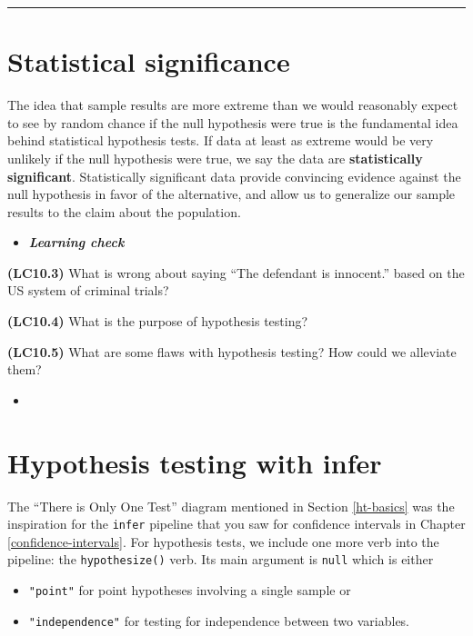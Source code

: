 \documentclass[12pt,]{krantz}
\providecommand{\tightlist}{%
  \setlength{\itemsep}{0pt}\setlength{\parskip}{0pt}}
\newenvironment{rmdblock}[1]
  {\begin{shaded*}
  \begin{itemize}
  \renewcommand{\labelitemi}{
    \raisebox{-.7\height}[0pt][0pt]{
    }
  }
  \item
  }
  {
  \end{itemize}
  \end{shaded*}
  }
\newenvironment{learncheck}
  {\begin{rmdblock}{warning}}
  {\end{rmdblock}}
\theoremstyle{definition}
\theoremstyle{definition}
\theoremstyle{definition}
\theoremstyle{remark}
\begin{document}
\begin{center}\rule{0.5\linewidth}{\linethickness}\end{center}

\section{Statistical significance}\label{statistical-significance}

The idea that sample results are more extreme than we would reasonably
expect to see by random chance if the null hypothesis were true is the
fundamental idea behind statistical hypothesis tests. If data at least
as extreme would be very unlikely if the null hypothesis were true, we
say the data are \textbf{statistically significant}. Statistically
significant data provide convincing evidence against the null hypothesis
in favor of the alternative, and allow us to generalize our sample
results to the claim about the population.

\begin{learncheck}
\textbf{\emph{Learning check}}
\end{learncheck}

\textbf{(LC10.3)} What is wrong about saying ``The defendant is
innocent.'' based on the US system of criminal trials?

\textbf{(LC10.4)} What is the purpose of hypothesis testing?

\textbf{(LC10.5)} What are some flaws with hypothesis testing? How could
we alleviate them?

\begin{learncheck}

\end{learncheck}

\section{Hypothesis testing with
infer}\label{hypothesis-testing-with-infer}

The ``There is Only One Test'' diagram mentioned in Section
\ref{ht-basics} was the inspiration for the \texttt{infer} pipeline that
you saw for confidence intervals in Chapter \ref{confidence-intervals}.
For hypothesis tests, we include one more verb into the pipeline: the
\texttt{hypothesize()} verb. Its main argument is \texttt{null} which is
either

\begin{itemize}
\tightlist
\item
  \texttt{"point"} for point hypotheses involving a single sample or
\item
  \texttt{"independence"} for testing for independence between two
  variables.
\end{itemize}
\end{document}
